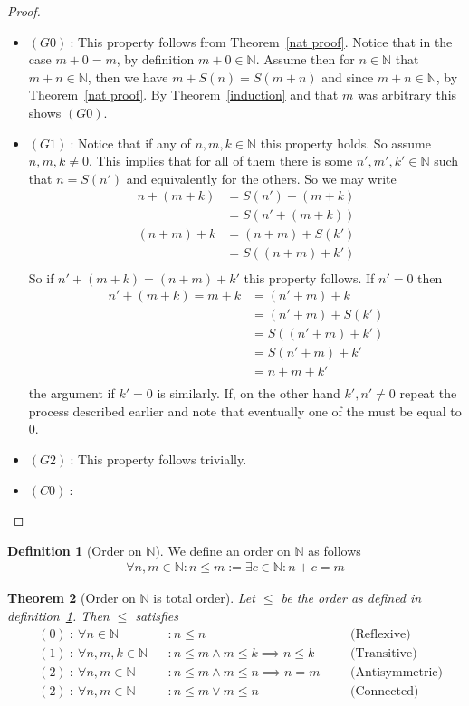 \documentclass[a4paper,11pt]{article}
\theoremstyle{plain}
\newtheorem{theorem}{Theorem}
\theoremstyle{definition}
\newtheorem{definition}[theorem]{Definition}
\newcommand{\N}{\mathbb{N}}
\begin{document}
\begin{proof}\
\begin{itemize}
	\item[] $(G0)\ $: This property follows from Theorem~\ref{nat
		proof}. Notice that in the case $m+0=m$, by definition
		$m+0\in\N$. Assume then for $n\in\N$ that $m+n\in\N$,
		then we have $m+S(n)=S(m+n)$ and since $m+n\in\N$,
		by Theorem~\ref{nat proof}. By Theorem~\ref{induction}
		and that $m$ was arbitrary this shows $(G0)$.
	\item[] $(G1)\ $: Notice that if any of $n,m,k\in\N$ this 
		property holds. So assume $n,m,k\neq 0$. This implies that
		for all of them there is some $n',m',k'\in\N$ such that
		$n=S(n')$ and equivalently for the others. So we may write
		\begin{align*}
			n+(m+k) &= S(n')+(m+k)\\
					&= S(n'+(m+k))\\
			(n+m)+k &= (n+m)+S(k')\\
					&= S((n+m)+k')\\
		\end{align*}
		So if $n'+(m+k)=(n+m)+k'$ this property follows. If
		$n'=0$ then
		\begin{align*}
			n'+(m+k)=m+k&=(n'+m)+k\\
						&=(n'+m)+S(k')\\
						&=S((n'+m)+k')\\
						&=S(n'+m)+k'\\
						&=n+m+k'\\
		\end{align*}
		the argument if $k'=0$ is similarly. If, on the other
		hand $k',n'\neq0$ repeat the process described earlier
		and note that eventually one of the must be equal to $0$.
	\item[] $(G2)\ $: This property follows trivially.
	\item[] $(C0)\ $:
\end{itemize}
\end{proof}
\begin{definition}[Order on $\N$]\label{order}
	We define an order on $\N$ as follows
	\begin{align*}
		\forall n,m\in\N:n\leq m:= \exists c\in\N:n+c=m
	\end{align*}
\end{definition}
\begin{theorem}[Order on $\N$ is total order]\label{well-ordered}
	Let $\leq$ be the order as defined in definition~\ref{order}. Then $\leq$
	satisfies
	\begin{align*}
		&(0)\ :\ \forall n\in\N &&: n\leq n
		&&&\text{(Reflexive)}\\
		&(1)\ :\ \forall n,m,k\in\N&&:n\leq m\land m\leq k\implies n\leq k
		&&&\text{(Transitive)}\\
		&(2)\ :\ \forall n,m\in\N &&:n\leq m\land m\leq n \implies n=m
		&&&\text{(Antisymmetric)}\\
		&(2)\ :\ \forall n,m\in\N &&:n\leq m\lor m\leq n
		&&&\text{(Connected)}\\
	\end{align*}
\end{theorem}
\end{document}
